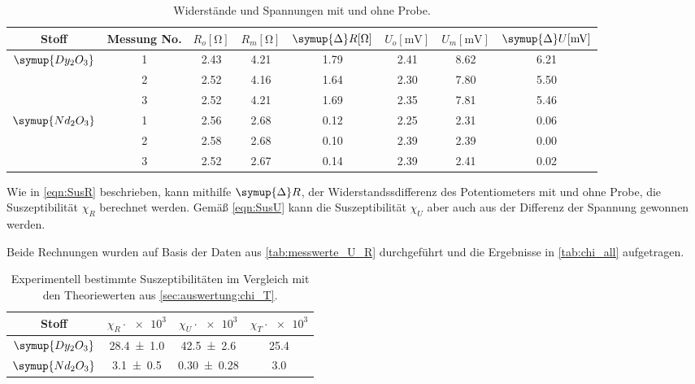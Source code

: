 \begin{table}
  \centering
  \caption{Widerstände und Spannungen mit und ohne Probe.}
  \label{tab:messwerte_U_R}
  \begin{tabular}{c c | S S S | S S S}
  \toprule
  Stoff &
  Messung No. &
  $R_o [\si{\ohm}]$ &
  $R_m [\si{\ohm}]$ &
  $\symup{\Delta}R [\si{\ohm}]$ &
  $U_o [\si{\milli\volt}]$ &
  $U_m [\si{\milli\volt}]$ &
  $\symup{\Delta}U [\si{\milli\volt}]$ \\
  \midrule
  $\symup{Dy_2O_3}$ & 1 & 2.43 & 4.21 & 1.79  &  2.41 & 8.62 & 6.21 \\
                    & 2 & 2.52 & 4.16 & 1.64  &  2.30 & 7.80 & 5.50 \\
                    & 3 & 2.52 & 4.21 & 1.69  &  2.35 & 7.81 & 5.46 \\
  \midrule
  $\symup{Nd_2O_3}$ & 1 & 2.56 & 2.68 & 0.12  &  2.25 & 2.31 & 0.06 \\
                    & 2 & 2.58 & 2.68 & 0.10  &  2.39 & 2.39 & 0.00 \\
                    & 3 & 2.52 & 2.67 & 0.14  &  2.39 & 2.41 & 0.02 \\
  \bottomrule
  \end{tabular}
\end{table}


Wie in \autoref{eqn:SusR} beschrieben,
kann mithilfe $\symup{\Delta}R$,
der Widerstandssdifferenz des Potentiometers mit und ohne Probe,
die Suszeptibilität $\chi_R$ berechnet werden.
Gemäß \autoref{eqn:SusU} kann die Suszeptibilität $\chi_U$ aber auch aus der
Differenz der Spannung gewonnen werden.

Beide Rechnungen wurden auf Basis der Daten aus \autoref{tab:messwerte_U_R} durchgeführt und die Ergebnisse in \autoref{tab:chi_all} aufgetragen.

\begin{table}
  \centering
  \caption{Experimentell bestimmte Suszeptibilitäten im Vergleich mit den Theoriewerten aus \autoref{sec:auswertung:chi_T}.}
  \label{tab:chi_all}
  \begin{tabular}{c c c S}
  \toprule
  Stoff &
  $\chi_R \cdot \num{e3}$ &
  $\chi_U \cdot \num{e3}$ &
  $\chi_T \cdot \num{e3}$ \\
  \midrule
  $\symup{Dy_2O_3}$ & \num{28.4 \pm 1.0} & \num{42.5 \pm 2.6}  & 25.4 \\
  $\symup{Nd_2O_3}$ & \num{3.1 \pm 0.5}  & \num{0.30 \pm 0.28} & 3.0  \\
  \bottomrule
  \end{tabular}
\end{table}
